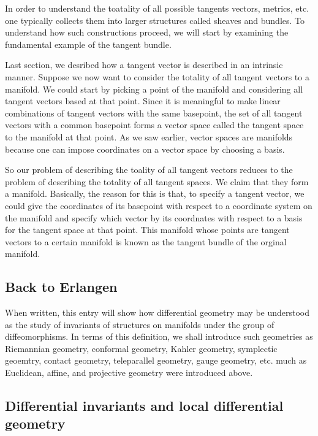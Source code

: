 \documentclass[12pt]{article}
\begin{document}
In order to understand the toatality of all possible tangents vectors,
metrics, etc. one typically collects them into larger structures
called sheaves and bundles.  To understand how such constructions
proceed, we will start by examining the fundamental example of the
tangent bundle.

Last section, we desribed how a tangent vector is described in an
intrinsic manner.  Suppose we now want to consider the totality of all
tangent vectors to a manifold.  We could start by picking a point of
the manifold and considering all tangent vectors based at that point.
Since it is meaningful to make linear combinations of tangent vectors
with the same basepoint, the set of all tangent vectors with a common
basepoint forms a vector space called the tangent space to the
manifold at that point.  As we saw earlier, vector spaces are
manifolds because one can impose coordinates on a vector space by
choosing a basis.

So our problem of describing the toality of all tangent vectors
reduces to the problem of describing the totality of all tangent
spaces.  We claim that they form a manifold.  Basically, the reason
for this is that, to specify a tangent vector, we could give the
coordinates of its basepoint with respect to a coordinate system on
the manifold and specify which vector by its coordnates with respect
to a basis for the tangent space at that point.  This manifold whose
points are tangent vectors to a certain manifold is known as the
tangent bundle of the orginal manifold.


\subsection{Back to Erlangen}

When written, this entry will show how differential geometry may be
understood as the study of invariants of structures on manifolds under
the group of diffeomorphisms.  In terms of this definition, we shall
introduce such geometries as Riemannian geometry, conformal geometry,
Kahler geometry, symplectic geoemtry, contact geometry, teleparallel
geometry, gauge geometry, etc. much as Euclidean, affine, and
projective geometry were introduced above.

\subsection{Differential invariants and local differential geometry}
\end{document}
